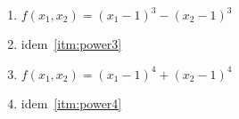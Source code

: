 \begin{enumerate}
    \begin{solution}
      \begin{enumerate}
        \item $f(x_1,x_2) = (x_1 - 1)^3 - (x_2 - 1)^3$ \label{itm:power3}
        \item idem~\ref{itm:power3}
        \item $f(x_1,x_2) = (x_1 - 1)^4 + (x_2 - 1)^4$ \label{itm:power4}
        \item idem~\ref{itm:power4}
      \end{enumerate}
    \end{solution}
    
\end{enumerate}

